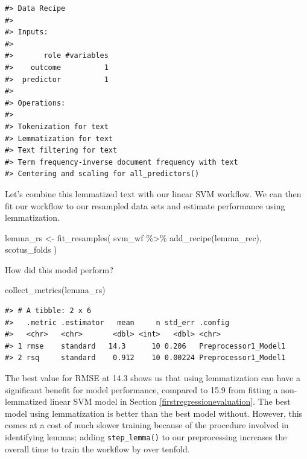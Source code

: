 \documentclass[
]{krantz}
\makeatletter
\newenvironment{Shaded}{\begin{snugshade}}{\end{snugshade}}
\newcommand{\FunctionTok}[1]{\textcolor[rgb]{0.00,0.00,0.00}{#1}}
\newcommand{\NormalTok}[1]{#1}
\newcommand{\OtherTok}[1]{\textcolor[rgb]{0.56,0.35,0.01}{#1}}
\newcommand{\SpecialCharTok}[1]{\textcolor[rgb]{0.00,0.00,0.00}{#1}}
\newenvironment{kframe}{%
\medskip{}
\setlength{\fboxsep}{.8em}
 \def\at@end@of@kframe{}%
 \ifinner\ifhmode%
  \def\at@end@of@kframe{\end{minipage}}%
  \begin{minipage}{\columnwidth}%
 \fi\fi%
 \def\FrameCommand##1{\hskip\@totalleftmargin \hskip-\fboxsep
 \colorbox{shadecolor}{##1}\hskip-\fboxsep
     \hskip-\linewidth \hskip-\@totalleftmargin \hskip\columnwidth}%
 \MakeFramed {\advance\hsize-\width
   \@totalleftmargin\z@ \linewidth\hsize
   \@setminipage}}%
 {\par\unskip\endMakeFramed%
 \at@end@of@kframe}
\renewenvironment{Shaded}{\begin{kframe}}{\end{kframe}}
\makeatother
\begin{document}
\begin{verbatim}
#> Data Recipe
#> 
#> Inputs:
#> 
#>       role #variables
#>    outcome          1
#>  predictor          1
#> 
#> Operations:
#> 
#> Tokenization for text
#> Lemmatization for text
#> Text filtering for text
#> Term frequency-inverse document frequency with text
#> Centering and scaling for all_predictors()
\end{verbatim}

Let's combine this lemmatized text with our linear SVM workflow. We can then fit our workflow to our resampled data sets and estimate performance using lemmatization.

\begin{Shaded}
\begin{Highlighting}[]
\NormalTok{lemma\_rs }\OtherTok{\textless{}{-}} \FunctionTok{fit\_resamples}\NormalTok{(}
\NormalTok{  svm\_wf }\SpecialCharTok{\%\textgreater{}\%} \FunctionTok{add\_recipe}\NormalTok{(lemma\_rec),}
\NormalTok{  scotus\_folds}
\NormalTok{)}
\end{Highlighting}
\end{Shaded}

How did this model perform?

\begin{Shaded}
\begin{Highlighting}[]
\FunctionTok{collect\_metrics}\NormalTok{(lemma\_rs)}
\end{Highlighting}
\end{Shaded}

\begin{verbatim}
#> # A tibble: 2 x 6
#>   .metric .estimator   mean     n std_err .config             
#>   <chr>   <chr>       <dbl> <int>   <dbl> <chr>               
#> 1 rmse    standard   14.3      10 0.206   Preprocessor1_Model1
#> 2 rsq     standard    0.912    10 0.00224 Preprocessor1_Model1
\end{verbatim}

The best value for RMSE at 14.3 shows us that using lemmatization can have a significant benefit for model performance, compared to 15.9 from fitting a non-lemmatized linear SVM model in Section \ref{firstregressionevaluation}. The best model using lemmatization is better than the best model without. However, this comes at a cost of much slower training because of the procedure involved in identifying lemmas; adding \texttt{step\_lemma()} to our preprocessing increases the overall time to train the workflow by over tenfold.
\end{document}
